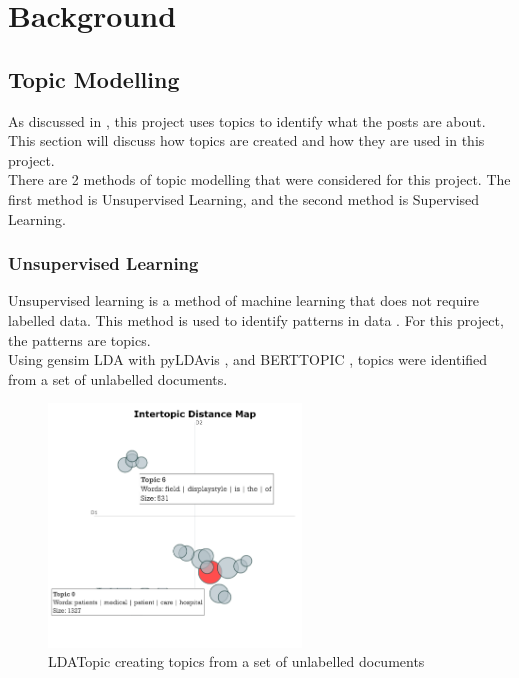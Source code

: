 \chapter{Background}
\label{ch:background}

\section{Topic Modelling}\label{sec:topic_modelling}
As discussed in , this project uses topics to identify what the posts are about. This section will discuss
how topics are created and how they are used in this project.\\
There are 2 methods of topic modelling that were considered for this project. The first method is Unsupervised Learning, and the
second method is Supervised Learning.\\
\subsection{Unsupervised Learning}
Unsupervised learning is a method of machine learning that does not require labelled data. This method is used to identify patterns
in data \cite{mahesh2020machine}. For this project, the patterns are topics.\\
Using gensim LDA \cite{gensimLDA} with pyLDAvis \cite{LDAVis}, and BERTTOPIC \cite{BERTTopic}, topics were identified from a set of unlabelled documents.
\newpage
\begin{figure}[hbtp]
    \centering
    \includegraphics[width=0.6\textwidth]{../images/ldatopic.png}
    \caption{LDATopic creating topics from a set of unlabelled documents}
    \label{fig:ldatopic}
\end{figure}

